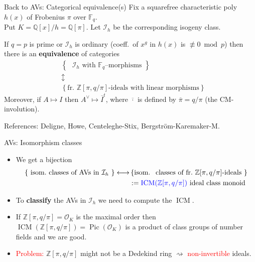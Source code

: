 \documentclass[usenames,dvipsnames]{beamer}
\def\Q{\mathbb{Q}}
\def\Z{\mathbb{Z}}
\def\F{\mathbb{F}}
\DeclareMathOperator{\ICM}{ICM}
\DeclareMathOperator{\Pic}{Pic}
\newcommand{\cO}{{\mathcal O}}
\newcommand{\set}[1]{\left\lbrace#1\right\rbrace }
\newcommand{\red}[1]{\textcolor{red}{#1}}
\newcommand{\blue}[1]{\textcolor{blue}{#1}}
\begin{document}
\begin{frame}{ Back to AVs: Categorical equivalence(s) }
    \pause
    Fix a squarefree characteristic poly $h(x)$ of Frobenius $\pi$ over $\F_q$.\\
    Put $K=\Q[x]/h=\Q[\pi]$.
    Let $\mathcal{I}_h$ be the corresponding isogeny class.
    \pause 
    \begin{theorem}
        If $q=p$ is prime or $\mathcal{I}_h$ is ordinary (coeff.~of $x^g$ in $h(x)$ is $\not\equiv 0\bmod p$)
        \pause then there is an {\bf equivalence} of categories
        \[
        \begin{array}{cc}
        & \set{ \text{ $\mathcal{I}_h$ with $\F_q$--morphisms } }  \\
        & \updownarrow \\ 
        & \set{ \text{fr.~$\Z[\pi,q/\pi]$-ideals with linear morphisms} }
        \end{array} 
        \]  
        \pause Moreover, if $A\mapsto I$ then $A^\vee \mapsto \overline{I}^t$, where $\overline{\cdot}$ is defined by $\overline{\pi}=q/\pi$ (the CM-involution).
    \end{theorem}
    \pause References: Deligne, Howe, Centeleghe-Stix, Bergstr\"om-Karemaker-M.
\end{frame}

\begin{frame}{ AVs: Isomorphism classes }
    \begin{itemize}
        \item
        We get a bijection
        \begin{align*}
            \set{ \text{ isom.~classes of AVs in $\mathcal{I}_h$ } } \longleftrightarrow & \set{ \text{isom.~ classes of fr.~$\Z[\pi,q/\pi]$-ideals } }\\
            & :=\blue{\ICM(\Z[\pi,q/\pi])} \text{ ideal class monoid}
        \end{align*}
        \item To {\bf classify} the AVs in $\mathcal{I}_h$ we need to compute the $\ICM$.
        \item
        If $\Z[\pi,q/\pi] = \cO_K$ is the maximal order then $\ICM(\Z[\pi,q/\pi]) = \Pic(\cO_K)$ is a product of class groups of number fields and we are good.
        \item
        \red{Problem:} $\Z[\pi,q/\pi]$ might not be a Dedekind ring $\rightsquigarrow $ \red{non-invertible} ideals.
    \end{itemize}
\end{frame}
\end{document}

